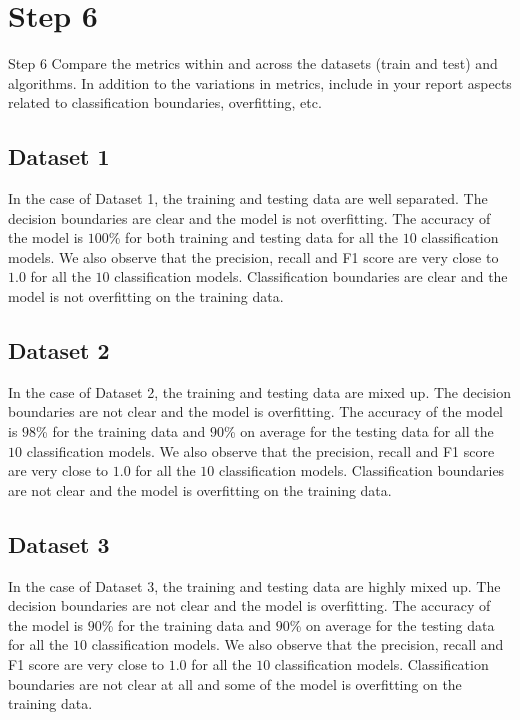\section*{Step 6}

\begin{custombox}[label={box:Q6}]{Step 6}
	Compare the metrics within and across the datasets (train and test) and algorithms. In addition to the variations in metrics, include in your report aspects related to classification boundaries, overfitting, etc.
\end{custombox}

\vspace{10mm}


\subsection*{Dataset 1}

In the case of Dataset 1, the training and testing data are well separated. The decision boundaries are clear and the model is not overfitting. The accuracy of the model is $100$\% for both training and testing data for all the $10$ classification models. We also observe that the precision, recall and F1 score are very close to $1.0$ for all the $10$ classification models. Classification boundaries are clear and the model is not overfitting on the training data.

\subsection*{Dataset 2}

In the case of Dataset 2, the training and testing data are mixed up. The decision boundaries are not clear and the model is overfitting. The accuracy of the model is $98$\% for the training data and $90$\% on average for the testing data for all the $10$ classification models. We also observe that the precision, recall and F1 score are very close to $1.0$ for all the $10$ classification models. Classification boundaries are not clear and the model is overfitting on the training data.

\subsection*{Dataset 3}

In the case of Dataset 3, the training and testing data are  highly mixed up. The decision boundaries are not clear and the model is overfitting. The accuracy of the model is $90$\% for the training data and $90$\% on average for the testing data for all the $10$ classification models. We also observe that the precision, recall and F1 score are very close to $1.0$ for all the $10$ classification models. Classification boundaries are not clear at all and some of the model is overfitting on the training data.




